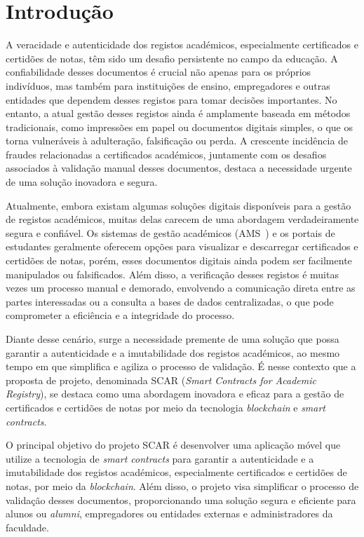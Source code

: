 \documentclass[10pt]{article}
\begin{document}
\section{Introdução}

A veracidade e autenticidade dos registos académicos, especialmente certificados e certidões de notas,
têm sido um desafio persistente no campo da educação. A confiabilidade desses documentos é crucial não apenas
para os próprios indivíduos, mas também para instituições de ensino, empregadores e outras entidades que
dependem desses registos para tomar decisões importantes. No entanto, a atual gestão desses registos
ainda é amplamente baseada em métodos tradicionais, como impressões em papel ou documentos digitais simples,
o que os torna vulneráveis à adulteração, falsificação ou perda. A crescente incidência de fraudes
relacionadas a certificados académicos, juntamente com os desafios associados à validação manual desses
documentos, destaca a necessidade urgente de uma solução inovadora e segura.

Atualmente, embora existam algumas soluções digitais disponíveis para a gestão de registos académicos,
muitas delas carecem de uma abordagem verdadeiramente segura e confiável. Os sistemas de gestão académicos
(AMS~\cite{LinWays}) e os portais de estudantes geralmente oferecem opções para visualizar e descarregar  certificados e certidões
de notas, porém, esses documentos digitais ainda podem ser facilmente manipulados ou falsificados. Além disso,
a verificação desses registos é muitas vezes um processo manual e demorado, envolvendo a comunicação direta entre
as partes interessadas ou a consulta a bases de dados centralizadas, o que pode comprometer a eficiência
e a integridade do processo.

Diante desse cenário, surge a necessidade premente de uma solução que possa garantir a autenticidade e a
imutabilidade dos registos académicos, ao mesmo tempo em que simplifica e agiliza o processo de validação.
É nesse contexto que a proposta de projeto, denominada SCAR (\textit{Smart Contracts for Academic Registry}),
se destaca como uma abordagem inovadora e eficaz para a gestão de certificados e certidões de notas por
meio da tecnologia \textit{blockchain} e \textit{smart contracts}.

O principal objetivo do projeto SCAR é desenvolver uma aplicação móvel que utilize a tecnologia de \textit{smart contracts}
para garantir a autenticidade e a imutabilidade dos registos académicos, especialmente certificados e certidões
de notas, por meio da \textit{blockchain}. Além disso, o projeto visa simplificar o processo de validação desses documentos,
proporcionando uma solução segura e eficiente para alunos ou \textit{alumni}, empregadores ou entidades externas e administradores da faculdade.
\end{document}
